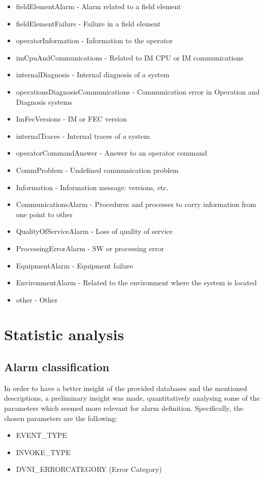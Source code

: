 \documentclass[a4paper,10pt]{report}
\begin{document}
\begin{itemize}
  \item fieldElementAlarm - Alarm related to a field element
  \item fieldElementFailure - Failure in a field element
  \item operatorInformation - Information to the operator
  \item imCpuAndCommunications - Related to IM CPU or IM communications
  \item internalDiagnosis - Internal diagnosis of a system
  \item operationsDiagnosisCommunications - Communication error in Operation and Diagnosis systems
  \item ImFecVersions - IM or FEC version
  \item internalTraces - Internal traces of a system
  \item operatorCommandAnswer - Answer to an operator command
  \item CommProblem - Undefined communication problem
  \item Information - Information message: versions, etc.
  \item CommunicationsAlarm - Procedures and processes to carry information from one point to other
  \item QualityOfServiceAlarm - Loss of quality of service
  \item ProcessingErrorAlarm - SW or processing error
  \item EquipmentAlarm - Equipment failure
  \item EnvironmentAlarm - Related to the environment where the system is located
  \item other - Other
\end{itemize}

\section{Statistic analysis}
\subsection{Alarm classification}
In order to have a better insight of the provided databases and the mentioned descriptions, a preliminary insight was made, quantitatively analysing some of the parameters which seemed more relevant for alarm definition. Specifically, the chosen parameters are the following:

\begin{itemize}
 \item EVENT\_TYPE
 \item INVOKE\_TYPE
 \item DVNI\_ERRORCATEGORY (Error Category)
\end{itemize}
\end{document}
